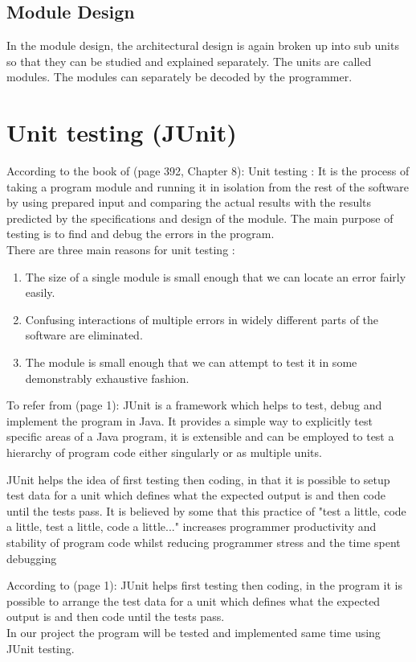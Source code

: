 \documentclass{article}
\begin{document}
\subsection{Module Design} 
In the module design, the architectural design is again broken up into sub units so that they can be studied and explained separately. The units are called modules. The modules can separately be decoded by the programmer. 
 
\section{Unit testing (JUnit)}
\label{sec:junit}

According to the book of \cite{Jones1990SoftwareEngineering}(page 392, Chapter 8): Unit testing : It is the process of taking a program module and running it in isolation from the rest of the software by using prepared input and comparing the actual results with the results  predicted by the specifications and design of the module. The main purpose of testing is to find and debug the errors in the program.\\
There are three main reasons for unit testing :
\begin{enumerate}
\item The size of a single module is small enough that we can locate an error fairly easily.
\item Confusing interactions of multiple errors in widely different parts of the software are eliminated.
\item The module is small enough that we can attempt to test it in some demonstrably exhaustive fashion.
\end{enumerate}
To refer from \cite{JUnitTestingUtilityTutorial}(page 1): JUnit is a framework which helps to test, debug and implement the program in Java. It provides a simple way to explicitly test specific areas of a Java program, it is extensible and can be employed to test a hierarchy of program code either singularly or as multiple units.

JUnit helps the idea of first testing then coding, in that it is possible to setup test data for a unit which defines what the expected output is and then code until the tests pass. It is believed by some that this practice of "test a little, code a little, test a little, code a little..." increases programmer productivity and stability of program code whilst reducing programmer stress and the time spent debugging

According to \cite{JUnitTestingUtilityTutorial}(page 1): JUnit helps first testing then coding, in the program it is possible to arrange the test data for a unit which defines what the expected output is and then code until the tests pass.\\
In our project the program will be tested and implemented same time using JUnit testing.  
\pagebreak
\end{document}
